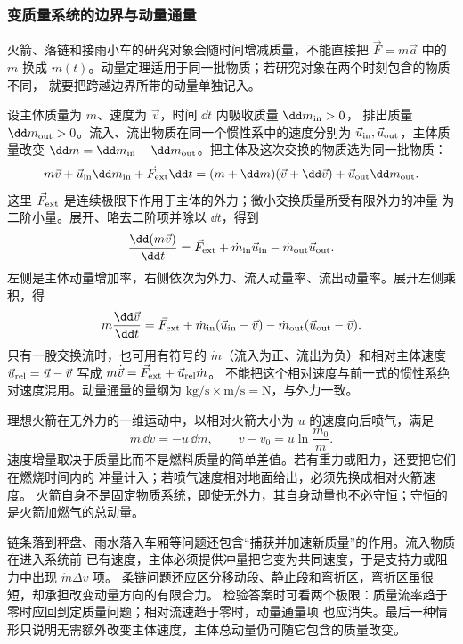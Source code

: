 \subsubsection*{变质量系统的边界与动量通量}

火箭、落链和接雨小车的研究对象会随时间增减质量，不能直接把 $\vec F=m\vec a$ 中的
$m$ 换成 $m(t)$。动量定理适用于同一批物质；若研究对象在两个时刻包含的物质不同，
就要把跨越边界所带的动量单独记入。

设主体质量为 $m$、速度为 $\vec v$，时间 $\dd t$ 内吸收质量 $\dd m_{\rm in}>0$，
排出质量 $\dd m_{\rm out}>0$。流入、流出物质在同一个惯性系中的速度分别为
$\vec u_{\rm in},\vec u_{\rm out}$，主体质量改变
$\dd m=\dd m_{\rm in}-\dd m_{\rm out}$。把主体及这次交换的物质选为同一批物质：
\[
 m\vec v+\vec u_{\rm in}\dd m_{\rm in}+\vec F_{\rm ext}\dd t
 =(m+\dd m)(\vec v+\dd\vec v)+\vec u_{\rm out}\dd m_{\rm out}.
\]
这里 $\vec F_{\rm ext}$ 是连续极限下作用于主体的外力；微小交换质量所受有限外力的冲量
为二阶小量。展开、略去二阶项并除以 $\dd t$，得到
\begin{equation}\label{eq:mass-flux-balance}
 \frac{\dd(m\vec v)}{\dd t}
 =\vec F_{\rm ext}+\dot m_{\rm in}\vec u_{\rm in}
 -\dot m_{\rm out}\vec u_{\rm out}.
\end{equation}
左侧是主体动量增加率，右侧依次为外力、流入动量率、流出动量率。展开左侧乘积，得
\begin{equation}\label{eq:mass-acceleration}
 m\frac{\dd\vec v}{\dd t}
 =\vec F_{\rm ext}+\dot m_{\rm in}(\vec u_{\rm in}-\vec v)
 -\dot m_{\rm out}(\vec u_{\rm out}-\vec v).
\end{equation}
只有一股交换流时，也可用有符号的 $\dot m$（流入为正、流出为负）和相对主体速度
$\vec u_{\rm rel}=\vec u-\vec v$ 写成 $m\dot{\vec v}=\vec F_{\rm ext}+\vec u_{\rm rel}\dot m$。
不能把这个相对速度与前一式的惯性系绝对速度混用。动量通量的量纲为
$\mathrm{kg/s}\times\mathrm{m/s}=\mathrm N$，与外力一致。

理想火箭在无外力的一维运动中，以相对火箭大小为 $u$ 的速度向后喷气，满足
\begin{equation}
 m\,\dd v=-u\,\dd m,
 \qquad
 v-v_0=u\ln\frac{m_0}{m}.
\end{equation}
速度增量取决于质量比而不是燃料质量的简单差值。若有重力或阻力，还要把它们在燃烧时间内的
冲量计入；若喷气速度相对地面给出，必须先换成相对火箭速度。
火箭自身不是固定物质系统，即使无外力，其自身动量也不必守恒；守恒的是火箭加燃气的总动量。

链条落到秤盘、雨水落入车厢等问题还包含“捕获并加速新质量”的作用。流入物质在进入系统前
已有速度，主体必须提供冲量把它变为共同速度，于是支持力或阻力中出现 $\dot m\Delta v$ 项。
柔链问题还应区分移动段、静止段和弯折区，弯折区虽很短，却承担改变动量方向的有限合力。
检验答案时可看两个极限：质量流率趋于零时应回到定质量问题；相对流速趋于零时，动量通量项
也应消失。最后一种情形只说明无需额外改变主体速度，主体总动量仍可随它包含的质量改变。
